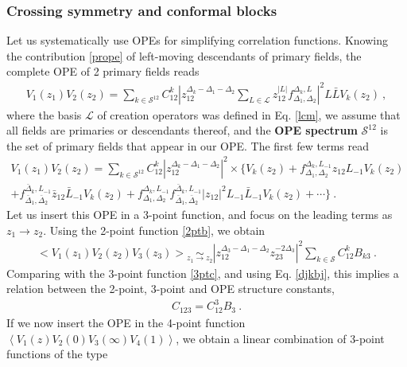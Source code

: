 \documentclass[12pt, a4paper]{article}
\newcommand{\myindex}[1]{\textbf{\boldmath #1}}
\begin{document}
\subsubsection{Crossing symmetry and conformal blocks}\label{sec:cscb}

Let us systematically use OPEs for simplifying correlation functions. Knowing the contribution \eqref{prope} of left-moving descendants of primary fields, the complete OPE of 2 primary fields reads 
\begin{align}
 V_1(z_1)V_2(z_2) = \sum_{k\in\mathcal{S}^{12}} C_{12}^k \left|z_{12}^{\Delta_k-\Delta_1-\Delta_2}\sum_{L\in\mathcal{L}} z_{12}^{|L|}f_{\Delta_1,\Delta_2}^{\Delta_k,L}\right|^2 L\bar L V_k(z_2)\ ,
 \label{tope}
\end{align}
where the basis $\mathcal{L}$ of creation operators was defined in Eq. \eqref{lcm},
we assume that all fields are primaries or descendants thereof, and the \myindex{OPE spectrum} $\mathcal{S}^{12}$ is the set of primary fields that appear in our OPE.
The first few terms read
\begin{multline}
 V_1(z_1)V_2(z_2) = \sum_{k\in\mathcal{S}^{12}} C_{12}^k \left|z_{12}^{\Delta_k-\Delta_1-\Delta_2}\right|^2
 \times \Big\{V_k(z_2) + f_{\Delta_1,\Delta_2}^{\Delta_k,L_{-1}} z_{12} L_{-1}V_k(z_2)
 \\
 + f_{\bar\Delta_1,\bar\Delta_2}^{\bar\Delta_k,L_{-1}} \bar z_{12} \bar L_{-1}V_k(z_2) + f_{\Delta_1,\Delta_2}^{\Delta_k,L_{-1}}f_{\bar\Delta_1,\bar\Delta_2}^{\bar\Delta_k,L_{-1}} |z_{12}|^2 L_{-1}\bar L_{-1}V_k(z_2)
 +\cdots \Big\} \ .
\end{multline}
Let us insert this OPE in a 3-point function, and focus on the leading terms as $z_1\to z_2$. Using the 2-point function \eqref{2ptb}, we obtain
\begin{align}
  \Big< V_1(z_1)V_2(z_2)V_3(z_3) \Big> \underset{z_1\to z_2}{\sim} 
  \left|z_{12}^{\Delta_3-\Delta_1-\Delta_2}z_{23}^{-2\Delta_3}\right|^2 
  \sum_{k\in\mathcal{S}}
  C_{12}^k B_{k3}\ .
\end{align}
Comparing with the 3-point function \eqref{3ptc}, and using Eq. \eqref{djkbj}, this implies a relation between the 2-point, 3-point and OPE structure constants,
\begin{align}
 \boxed{C_{123} = C_{12}^3B_{3}} \ .
 \label{ccb}
\end{align}
If we now insert the OPE in the 4-point function $\left<V_1(z)V_2(0)V_3(\infty)V_4(1)\right>$, we obtain a linear combination of 3-point functions of the type 
\end{document}
